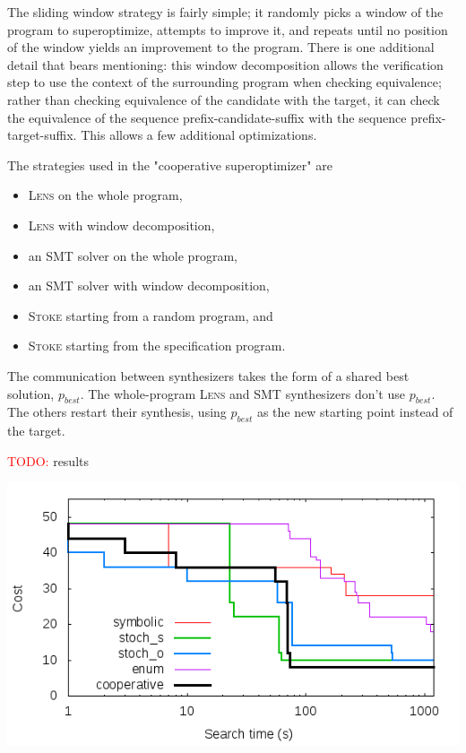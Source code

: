 \documentclass[12pt,twoside]{reedthesis}
\newcommand{\red}[1]{\textcolor{red}{#1}}
\begin{document}
The sliding window strategy is fairly simple; it randomly picks a window of the program to superoptimize, attempts to improve it, and repeats until no position of the window yields an improvement to the program.
There is one additional detail that bears mentioning: 
    this window decomposition allows the verification step to use the context of the surrounding program when checking equivalence;
    rather than checking equivalence of the candidate with the target, it can check the equivalence of the sequence prefix-candidate-suffix with the sequence prefix-target-suffix.
This allows a few additional optimizations.

The strategies used in the "cooperative superoptimizer" are
\begin{itemize}
    \item \textsc{Lens} on the whole program,
    \item \textsc{Lens} with window decomposition,
    \item an SMT solver on the whole program,
    \item an SMT solver with window decomposition,
    \item \textsc{Stoke} starting from a random program, and
    \item \textsc{Stoke} starting from the specification program.
\end{itemize}
The communication between synthesizers takes the form of a shared best solution, $p_{best}$.
The whole-program \textsc{Lens} and SMT synthesizers don't use $p_{best}$. The others restart their synthesis, using $p_{best}$ as the new starting point instead of the target.

\red{TODO:} results

\includegraphics[scale=0.5]{scaling}

\end{document}
